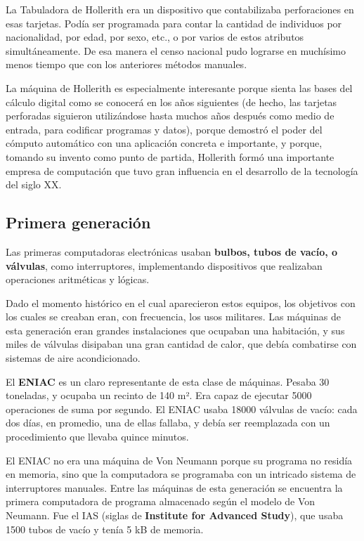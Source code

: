\documentclass[spanish,A4,]{article}
\begin{document}
La Tabuladora de Hollerith era un dispositivo que contabilizaba
perforaciones en esas tarjetas. Podía ser programada para contar la
cantidad de individuos por nacionalidad, por edad, por sexo, etc., o por
varios de estos atributos simultáneamente. De esa manera el censo
nacional pudo lograrse en muchísimo menos tiempo que con los anteriores
métodos manuales.

La máquina de Hollerith es especialmente interesante porque sienta las
bases del cálculo digital como se conocerá en los años siguientes (de
hecho, las tarjetas perforadas siguieron utilizándose hasta muchos años
después como medio de entrada, para codificar programas y datos), porque
demostró el poder del cómputo automático con una aplicación concreta e
importante, y porque, tomando su invento como punto de partida,
Hollerith formó una importante empresa de computación que tuvo gran
influencia en el desarrollo de la tecnología del siglo XX.

\subsection{Primera generación}\label{primera-generaciuxf3n}

Las primeras computadoras electrónicas usaban \textbf{bulbos, tubos de
vacío, o válvulas}, como interruptores, implementando dispositivos que
realizaban operaciones aritméticas y lógicas.

Dado el momento histórico en el cual aparecieron estos equipos, los
objetivos con los cuales se creaban eran, con frecuencia, los usos
militares. Las máquinas de esta generación eran grandes instalaciones
que ocupaban una habitación, y sus miles de válvulas disipaban una gran
cantidad de calor, que debía combatirse con sistemas de aire
acondicionado.

El \textbf{ENIAC} es un claro representante de esta clase de máquinas.
Pesaba 30 toneladas, y ocupaba un recinto de 140 m². Era capaz de
ejecutar 5000 operaciones de suma por segundo. El ENIAC usaba 18000
válvulas de vacío: cada dos días, en promedio, una de ellas fallaba, y
debía ser reemplazada con un procedimiento que llevaba quince minutos.

El ENIAC no era una máquina de Von Neumann porque su programa no residía
en memoria, sino que la computadora se programaba con un intricado
sistema de interruptores manuales. Entre las máquinas de esta generación
se encuentra la primera computadora de programa almacenado según el
modelo de Von Neumann. Fue el IAS (siglas de \textbf{Institute for
Advanced Study}), que usaba 1500 tubos de vacío y tenía 5 kB de memoria.
\end{document}
